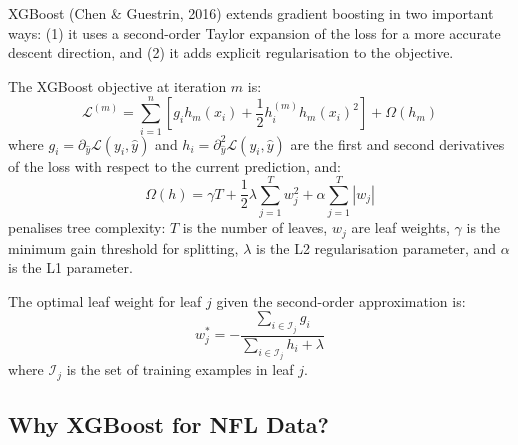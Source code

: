 \documentclass[11pt]{article}
\begin{document}
XGBoost (Chen \& Guestrin, 2016) extends gradient boosting in two important
ways: (1) it uses a second-order Taylor expansion of the loss for a more
accurate descent direction, and (2) it adds explicit regularisation to the
objective.

The XGBoost objective at iteration $m$ is:
\begin{equation}
  \mathcal{L}^{(m)} = \sum_{i=1}^{n} \left[
    g_i h_m(x_i) + \frac{1}{2} h_i^{(m)} h_m(x_i)^2
  \right] + \Omega(h_m)
\end{equation}
where $g_i = \partial_{\hat{y}} \mathcal{L}(y_i, \hat{y})$ and
$h_i = \partial_{\hat{y}}^2 \mathcal{L}(y_i, \hat{y})$ are the first and second
derivatives of the loss with respect to the current prediction, and:
\begin{equation}
  \Omega(h) = \gamma T + \frac{1}{2} \lambda \sum_{j=1}^{T} w_j^2 + \alpha \sum_{j=1}^T |w_j|
\end{equation}
penalises tree complexity: $T$ is the number of leaves, $w_j$ are leaf weights,
$\gamma$ is the minimum gain threshold for splitting, $\lambda$ is the L2
regularisation parameter, and $\alpha$ is the L1 parameter.

The optimal leaf weight for leaf $j$ given the second-order approximation is:
\begin{equation}
  w_j^* = -\frac{\sum_{i \in \mathcal{I}_j} g_i}{\sum_{i \in \mathcal{I}_j} h_i + \lambda}
\end{equation}
where $\mathcal{I}_j$ is the set of training examples in leaf $j$.

\subsection{Why XGBoost for NFL Data?}
\end{document}
